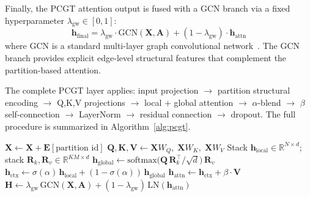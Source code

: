 Finally, the PCGT attention output is fused with a GCN branch via a fixed hyperparameter $\lambda_{\text{gw}} \in [0,1]$:
\begin{equation}
\mathbf{h}_{\text{final}} = \lambda_{\text{gw}} \cdot \text{GCN}(\mathbf{X}, \mathbf{A}) + (1 - \lambda_{\text{gw}}) \cdot \mathbf{h}_{\text{attn}}
\end{equation}
where GCN is a standard multi-layer graph convolutional network~\citep{kipf2017semi}. The GCN branch provides explicit edge-level structural features that complement the partition-based attention.

The complete PCGT layer applies: input projection $\to$ partition structural encoding $\to$ Q,K,V projections $\to$ local + global attention $\to$ $\alpha$-blend $\to$ $\beta$ self-connection $\to$ LayerNorm $\to$ residual connection $\to$ dropout. The full procedure is summarized in Algorithm~\ref{alg:pcgt}.

\begin{algorithm}[t]
\caption{PCGT Forward Pass (one layer)}
\label{alg:pcgt}
\DontPrintSemicolon
{}
\BlankLine
{}
$\mathbf{X} \leftarrow \mathbf{X} + \mathbf{E}[\text{partition id}]$ 
$\mathbf{Q}, \mathbf{K}, \mathbf{V} \leftarrow \mathbf{X} W_Q,\; \mathbf{X} W_K,\; \mathbf{X} W_V$\;
\BlankLine
{}
\smallskip
Stack $\mathbf{h}_{\mathrm{local}} \!\in\! \mathbb{R}^{N \times d}$;\; stack $\mathbf{R}_k, \mathbf{R}_v \!\in\! \mathbb{R}^{KM \times d}$\;
\BlankLine
{}
$\mathbf{h}_{\mathrm{global}} \leftarrow \mathrm{softmax}\!\bigl(\mathbf{Q}\, \mathbf{R}_k^{\!\top}\!/\sqrt{d}\bigr)\, \mathbf{R}_v$\;
\BlankLine
{}
$\mathbf{h}_{\mathrm{ctx}} \leftarrow \sigma(\alpha)\, \mathbf{h}_{\mathrm{local}} + (1\!-\!\sigma(\alpha))\, \mathbf{h}_{\mathrm{global}}$\;
\smallskip
$\mathbf{h}_{\mathrm{attn}} \leftarrow \mathbf{h}_{\mathrm{ctx}} + \beta \cdot \mathbf{V}$\;
\smallskip
$\mathbf{H} \leftarrow \lambda_{\mathrm{gw}}\, \mathrm{GCN}(\mathbf{X}, \mathbf{A}) + (1\!-\!\lambda_{\mathrm{gw}})\, \mathrm{LN}(\mathbf{h}_{\mathrm{attn}})$\;
\BlankLine
{}
\end{algorithm}

